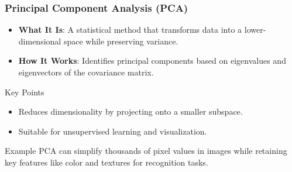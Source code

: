 \documentclass[aspectratio=169]{beamer}
\begin{document}
\begin{frame}[fragile]
    \frametitle{Principal Component Analysis (PCA)}
    \begin{itemize}
        \item \textbf{What It Is}: A statistical method that transforms data into a lower-dimensional space while preserving variance.
        \item \textbf{How It Works}: Identifies principal components based on eigenvalues and eigenvectors of the covariance matrix.
    \end{itemize}
    \begin{block}{Key Points}
        \begin{itemize}
            \item Reduces dimensionality by projecting onto a smaller subspace.
            \item Suitable for unsupervised learning and visualization.
        \end{itemize}
    \end{block}
    \begin{block}{Example}
        PCA can simplify thousands of pixel values in images while retaining key features like color and textures for recognition tasks.
    \end{block}
\end{frame}
\end{document}
